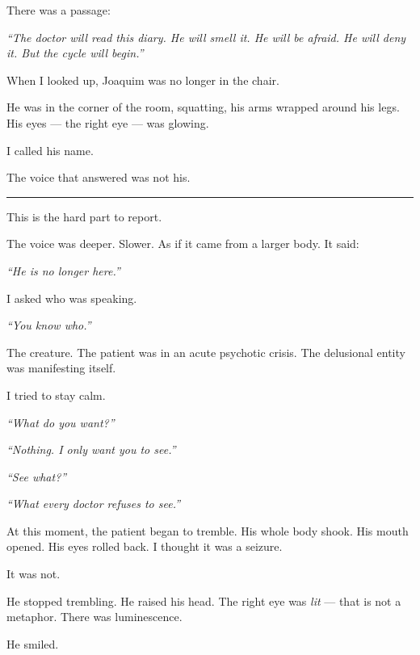 \noindent There was a passage:

\noindent \textit{\textquotedblleft{}The doctor will read this diary. He will smell it. He will be afraid. He will deny it. But the cycle will begin.\textquotedblright{}}

\noindent When I looked up, Joaquim was no longer in the chair.

\noindent He was in the corner of the room, squatting, his arms wrapped around his legs. His eyes --- the right eye --- was glowing.

\noindent I called his name.

\noindent The voice that answered was not his.

\vspace{0.5em}\noindent\rule{\textwidth}{0.5pt}\vspace{0.5em}

\noindent This is the hard part to report.

\noindent The voice was deeper. Slower. As if it came from a larger body. It said:

\noindent \textit{\textquotedblleft{}He is no longer here.\textquotedblright{}}

\noindent I asked who was speaking.

\noindent \textit{\textquotedblleft{}You know who.\textquotedblright{}}

\noindent The creature. The patient was in an acute psychotic crisis. The delusional entity was manifesting itself.

\noindent I tried to stay calm.

\noindent \textit{\textquotedblleft{}What do you want?\textquotedblright{}}

\noindent \textit{\textquotedblleft{}Nothing. I only want you to see.\textquotedblright{}}

\noindent \textit{\textquotedblleft{}See what?\textquotedblright{}}

\noindent \textit{\textquotedblleft{}What every doctor refuses to see.\textquotedblright{}}

\noindent At this moment, the patient began to tremble. His whole body shook. His mouth opened. His eyes rolled back. I thought it was a seizure.

\noindent It was not.

\noindent He stopped trembling. He raised his head. The right eye was \textit{lit} --- that is not a metaphor. There was luminescence.

\noindent He smiled.

